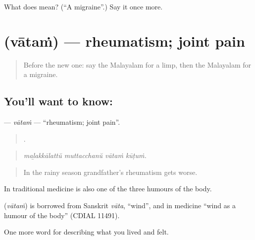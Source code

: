 \begin{tcolorbox}[breakable,colback=teal!4,colframe=teal!35!black,title={Before you move on}]
What does  mean? (\textquotedblleft{}A migraine\textquotedblright{}.) Say it once more.
\end{tcolorbox}
\section[\texorpdfstring{\ml{വാതം} (vātaṁ)}{വാതം (vātaṁ)}]{ (vātaṁ) — rheumatism; joint pain}

\label{lesson:ML-C535-vatam}



\begin{quote}
Before the new one: say the Malayalam for a limp, then the Malayalam for a migraine.
\end{quote}

\subsection*{You'll want to know: }
\textbf{} — \emph{vātaṁ} — \textquotedblleft{}rheumatism; joint pain\textquotedblright{}.

\begin{quote}
   .
\end{quote}

\begin{quote}
\emph{maḻakkālattŭ muttacchanŭ vātaṁ kūṭuṁ.}
\end{quote}

\begin{quote}
In the rainy season grandfather's rheumatism gets worse.
\end{quote}

In traditional medicine  is also one of the three humours of the body.

\begin{cousinweb}
\textbf{} (\emph{vātaṁ}) is borrowed from Sanskrit \emph{vāta}, \textquotedblleft{}wind\textquotedblright{}, and in medicine \textquotedblleft{}wind as a humour of the body\textquotedblright{} (CDIAL 11491).
\end{cousinweb}

\begin{grammarlens}[title={What you've built}]
One more word for describing what you lived and felt.
\end{grammarlens}

